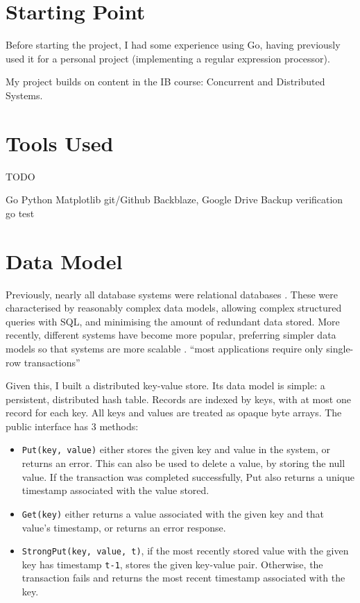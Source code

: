 \documentclass[12pt,a4paper,twoside,openany]{report}
\begin{document}
\section{Starting Point}

Before starting the project, I had some experience using Go, having previously used it for a personal project (implementing a regular expression processor).

My project builds on content in the IB course: Concurrent and Distributed Systems.

\section{Tools Used}

TODO

Go
Python
Matplotlib
git/Github
Backblaze, Google Drive
Backup verification
go test

\section{Data Model}

Previously, nearly all database systems were relational databases \cite{lake2013}. These were characterised by reasonably complex data models, allowing complex structured queries with SQL, and minimising the amount of redundant data stored. More recently, different systems have become more popular, preferring simpler data models so that systems are more scalable \cite{bailis2013highly}. ``most applications require only single-row transactions'' \cite{chang2008bigtable}

Given this, I built a distributed key-value store. Its data model is simple: a persistent, distributed hash table. Records are indexed by keys, with at most one record for each key. All keys and values are treated as opaque byte arrays. The public interface has 3 methods:

\begin{itemize}
\item
\verb|Put(key, value)| either stores the given key and value in the system, or returns an error. This can also be used to delete a value, by storing the null value. If the transaction was completed successfully, Put also returns a unique timestamp associated with the value stored.

\item
\verb|Get(key)| either returns a value associated with the given key and that value's timestamp, or returns an error response.

\item
\verb|StrongPut(key, value, t)|, if the most recently stored value with the given key has timestamp \verb|t-1|, stores the given key-value pair. Otherwise, the transaction fails and returns the most recent timestamp associated with the key.

\end{itemize}
\end{document}
